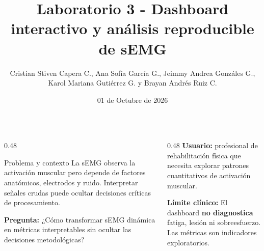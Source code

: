 \documentclass[10pt, aspectratio=169]{beamer}
\title[Laboratorio 3 sEMG reproducible]{Laboratorio 3 - Dashboard interactivo y análisis reproducible de sEMG}
\author[Integrantes]{Cristian Stiven Capera C., Ana Sofía García G., Jeimmy Andrea Gonzáles G., Karol Mariana Gutiérrez G. y Brayan Andrés Ruiz C.}
\date{01 de Octubre de 2026}
\begin{document}
\begin{frame}
\titlepage
\begin{columns}[t]
    \begin{column}{0.48\textwidth}
        \begin{block}{Problema y contexto}
        \fontsize{8.5pt}{10.5pt}\selectfont
        La sEMG observa la activación muscular pero depende de factores anatómicos, electrodos y ruido. Interpretar señales crudas puede ocultar decisiones críticas de procesamiento.
        \end{block}
        
        \vspace{0.1cm}
        \fontsize{8.5pt}{10.5pt}\selectfont
        \textbf{Pregunta:} ¿Cómo transformar sEMG dinámica en métricas interpretables sin ocultar las decisiones metodológicas?
    \end{column}
    
    \begin{column}{0.48\textwidth}
        \fontsize{8.5pt}{10.5pt}\selectfont
        \textbf{Usuario:} profesional de rehabilitación física que necesita explorar patrones cuantitativos de activación muscular.
        
        \vspace{0.2cm}
        \textbf{Límite clínico:} El dashboard \textbf{no diagnostica} fatiga, lesión ni sobreesfuerzo. Las métricas son indicadores exploratorios.
    \end{column}
\end{columns}
\end{frame}
\end{document}
